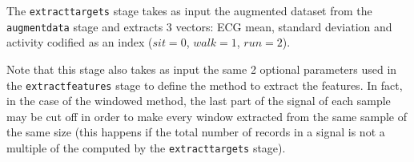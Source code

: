 The \texttt{extracttargets} stage takes as input the augmented dataset from the
\texttt{augmentdata} stage and extracts 3 vectors: ECG mean, standard deviation
and activity codified as an index (\(sit = 0\), \(walk = 1\), \(run = 2\)).

Note that this stage also takes as input the same 2 optional parameters used in
the \texttt{extractfeatures} stage to define the method to extract the
features. In fact, in the case of the windowed method, the last part of the
signal of each sample may be cut off in order to make every window extracted
from the same sample of the same size (this happens if the total number of
records in a signal is not a multiple of the  computed by the
\texttt{extracttargets} stage).
